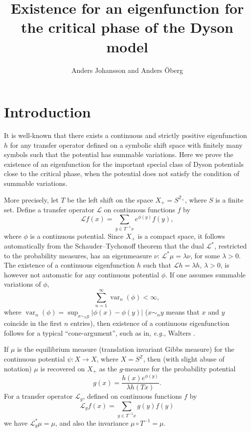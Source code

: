 \documentclass[11pt, a4paper, oneside]{article}
\title{Existence for an eigenfunction for the critical phase of the Dyson model}
\author{Anders Johansson and Anders \"Oberg}
\date{}
\theoremstyle{definition}
\theoremstyle{remark}
\providecommand{\opn}{\operatorname}
\providecommand{\var}{\opn{var}}
\begin{document}
\maketitle


\section{Introduction}\noindent
It is well-known that there exists a continuous and strictly positive eigenfunction $h$ for any transfer operator defined on a symbolic shift space with finitely many symbols such that the potential has summable variations. Here we prove the existence of an eigenfunction for the important special class of Dyson potentials close to the critical phase, when the potential does not satisfy the condition of summable variations.

More precisely, let $T$ be the left shift on the space $X_+=S^{{\mathbb Z}_+}$, where $S$ is a finite set. Define a transfer operator ${\mathcal L}$ on continuous functions $f$ by
\begin{equation}\label{trans}
{\mathcal L} f(x)= \sum_{y\in T^{-1}x} e^{\phi(y)}f(y),
\end{equation}
where $\phi$ is a continuous potential. Since $X_+$ is a compact space, it follows automatically from the Schauder--Tychonoff theorem that the dual ${\mathcal L}^*$, restricted to the probability measures, has an eigenmeasure $\nu$: ${\mathcal L}^* \mu=\lambda \nu$, for some $\lambda>0$. The existence of a continuous eigenfunction $h$ such that ${\mathcal L}h=\lambda h$, $\lambda>0$, is however not automatic for any continuous potential $\phi$. If one assumes summable variations of $\phi$, 
\begin{equation}\label{sum}
\sum_{n=1}^\infty \var_n (\phi)<\infty,
\end{equation}
where $\var_n(\phi)=\sup_{x\sim_n y}|\phi(x)-\phi(y)|$ ($x\sim_n y$ means that $x$ and $y$ coincide in the first $n$ entries), 
then existence of a continuous eigenfunction follows for a typical ``cone-argument'', such as in, {\em e.g.}, Walters \cite{walters1}.

If $\mu$ is the equilibrium measure (translation invariant Gibbs measure) for the continuous potential $\psi:X\to X$, where $X=S^{\mathbb Z}$, then (with slight abuse of notation) $\mu$ is recovered on $X_+$ as the $g$-measure for the probability potential 
\begin{equation}\label{g} 
g(x)= \frac{h(x) e^{\phi(y)}}{\lambda h(Tx)}.
\end{equation} 
For a transfer operator ${\mathcal L}_g$, defined on continuous functions $f$ by
\begin{equation}
{\mathcal L}_g f(x)=\sum_{y\in T^{-1}x} g(y) f(y)
\end{equation}
we have ${\mathcal L}_g^*\mu=\mu$, and also the invariance $\mu\circ T^{-1}=\mu$.
\end{document}

